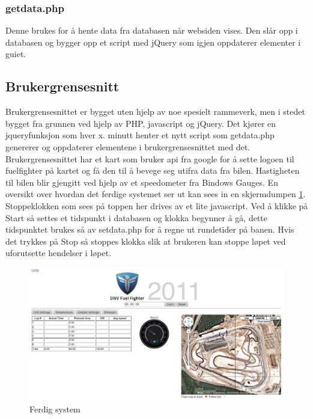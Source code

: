 \subsubsection{getdata.php}
Denne brukes for å hente data fra databasen når websiden vises. Den slår opp i databasen og bygger opp et script med jQuery\cite{jquery} som igjen oppdaterer elementer i guiet.
\subsection{Brukergrensesnitt}
Brukergrensesnittet er bygget uten hjelp av noe spesielt rammeverk, men i stedet bygget fra grunnen ved hjelp av PHP, javascript og jQuery\cite{jquery}. Det kjører en jqueryfunksjon som hver x. minutt henter et nytt script som getdata.php genererer og oppdaterer elementene i brukergrensesnittet med det. Brukergrensesnittet har et kart som bruker api fra google for å sette logoen til fuelfighter på kartet og få den til å bevege seg utifra data fra bilen. Hastigheten til bilen blir gjengitt ved hjelp av et speedometer fra Bindows Gauges\cite{bindows}. En oversikt over hvordan det ferdige systemet ser ut kan sees in en skjermdumpen \ref{gui}. Stoppeklokken som sees på toppen her drives av et lite javascript. Ved å klikke på Start så settes et tidspunkt i databasen og klokka begynner å gå, dette tidspunktet brukes så av setdata.php for å regne ut rundetider på banen. Hvis det trykkes på Stop så stoppes klokka slik at brukeren kan stoppe løpet ved uforutsette hendelser i løpet.
\begin{figure}[H]
\caption{Ferdig system} 
\label{gui}
\includegraphics[width=\textwidth]{images/gui.png}
\end{figure}
